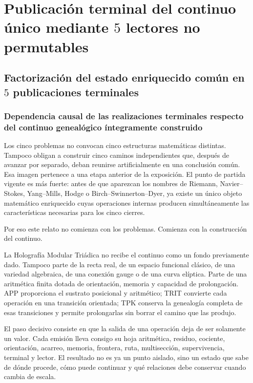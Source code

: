 \section{Publicación terminal del continuo único mediante \(5\) lectores no permutables}
\subsection{Factorización del estado enriquecido común en \(5\) publicaciones terminales}
\subsubsection{Dependencia causal de las realizaciones terminales respecto del continuo genealógico íntegramente construido}
Los cinco problemas no convocan cinco estructuras matemáticas distintas. Tampoco obligan a construir cinco caminos independientes que, después de avanzar por separado, deban reunirse artificialmente en una conclusión común. Esa imagen pertenece a una etapa anterior de la exposición. El punto de partida vigente es más fuerte: antes de que aparezcan los nombres de Riemann, Navier–Stokes, Yang–Mills, Hodge o Birch–Swinnerton–Dyer, ya existe un único objeto matemático enriquecido cuyas operaciones internas producen simultáneamente las características necesarias para los cinco cierres.\par
Por eso este relato no comienza con los problemas. Comienza con la construcción del continuo.\par
La Holografía Modular Triádica no recibe el continuo como un fondo previamente dado. Tampoco parte de la recta real, de un espacio funcional clásico, de una variedad algebraica, de una conexión gauge o de una curva elíptica. Parte de una aritmética finita dotada de orientación, memoria y capacidad de prolongación. APP proporciona el sustrato posicional y aritmético; TRIT convierte cada operación en una transición orientada; TPK conserva la genealogía completa de esas transiciones y permite prolongarlas sin borrar el camino que las produjo.\par
El paso decisivo consiste en que la salida de una operación deja de ser solamente un valor. Cada emisión lleva consigo su hoja aritmética, residuo, cociente, orientación, acarreo, memoria, frontera, ruta, multisección, supervivencia, terminal y lector. El resultado no es ya un punto aislado, sino un estado que sabe de dónde procede, cómo puede continuar y qué relaciones debe conservar cuando cambia de escala.\par
